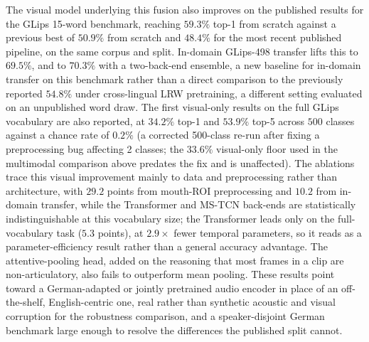 \documentclass[10pt, a4paper]{article}
\begin{document}
\noindent The visual model underlying this fusion also improves on the published results for the GLips 15-word benchmark, reaching $59.3\%$ top-1 from scratch against a previous best of $50.9\%$ from scratch and $48.4\%$ for the most recent published pipeline, on the same corpus and split. In-domain GLips-498 transfer lifts this to $69.5\%$, and to $70.3\%$ with a two-back-end ensemble, a new baseline for in-domain transfer on this benchmark rather than a direct comparison to the previously reported $54.8\%$ under cross-lingual LRW pretraining, a different setting evaluated on an unpublished word draw. The first visual-only results on the full GLips vocabulary are also reported, at $34.2\%$ top-1 and $53.9\%$ top-5 across $500$ classes against a chance rate of $0.2\%$ (a corrected 500-class re-run after fixing a preprocessing bug affecting 2 classes; the $33.6\%$ visual-only floor used in the multimodal comparison above predates the fix and is unaffected). The ablations trace this visual improvement mainly to data and preprocessing rather than architecture, with $29.2$ points from mouth-ROI preprocessing and $10.2$ from in-domain transfer, while the Transformer and MS-TCN back-ends are statistically indistinguishable at this vocabulary size; the Transformer leads only on the full-vocabulary task ($5.3$ points), at $2.9\times$ fewer temporal parameters, so it reads as a parameter-efficiency result rather than a general accuracy advantage. The attentive-pooling head, added on the reasoning that most frames in a clip are non-articulatory, also fails to outperform mean pooling.
\noindent These results point toward a German-adapted or jointly pretrained audio encoder in place of an off-the-shelf, English-centric one, real rather than synthetic acoustic and visual corruption for the robustness comparison, and a speaker-disjoint German benchmark large enough to resolve the differences the published split cannot.
\end{document}
